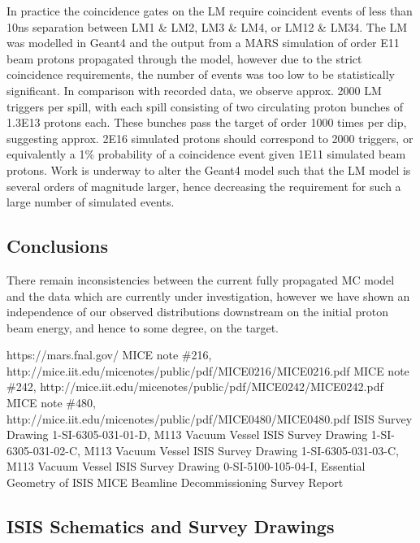 \documentclass[a4paper,11pt]{article}
\begin{document}
In practice the coincidence gates on the LM require coincident events of less than 10ns separation between LM1 \& LM2, LM3 \& LM4, or LM12 \& LM34. The LM was modelled in Geant4 and the output from a MARS simulation of order E11 beam protons propagated through the model, however due to the strict coincidence requirements, the number of events was too low to be statistically significant. In comparison with recorded data, we observe approx. 2000 LM triggers per spill, with each spill consisting of two circulating proton bunches of 1.3E13 protons each. These bunches pass the target of order 1000 times per dip, suggesting approx. 2E16 simulated protons should correspond to 2000 triggers, or equivalently a 1\% probability of a coincidence event given 1E11 simulated beam protons. Work is underway to alter the Geant4 model such that the LM model is several orders of magnitude larger, hence decreasing the requirement for such a large number of simulated events. 



\section{Conclusions}

There remain inconsistencies between the current fully propagated MC model and the data which are currently under investigation, however we have shown an independence of our observed distributions downstream on the initial proton beam energy, and hence to some degree, on the target. 

\begin{thebibliography}{9}
 https://mars.fnal.gov/
 MICE note \#216, http://mice.iit.edu/micenotes/public/pdf/MICE0216/MICE0216.pdf
 MICE note \#242, http://mice.iit.edu/micenotes/public/pdf/MICE0242/MICE0242.pdf
 MICE note \#480, http://mice.iit.edu/micenotes/public/pdf/MICE0480/MICE0480.pdf
 ISIS Survey Drawing 1-SI-6305-031-01-D, M113 Vacuum Vessel
 ISIS Survey Drawing 1-SI-6305-031-02-C, M113 Vacuum Vessel
 ISIS Survey Drawing 1-SI-6305-031-03-C, M113 Vacuum Vessel
 ISIS Survey Drawing 0-SI-5100-105-04-I, Essential Geometry of ISIS
 MICE Beamline Decommissioning Survey Report


\end{thebibliography}

\begin{appendices}
\chapter{ISIS Schematics and Survey Drawings}






\end{appendices}
\end{document}
